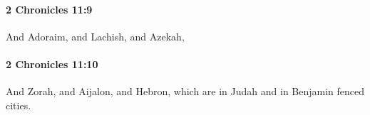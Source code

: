 		\paragraph{2 Chronicles 11:9} %
			\label{2CHRONICLES-11-9}

			And Adoraim, and Lachish, and Azekah,


		\paragraph{2 Chronicles 11:10} %
			\label{2CHRONICLES-11-10}

			And Zorah, and Aijalon, and Hebron, which are in Judah and in Benjamin fenced cities.


